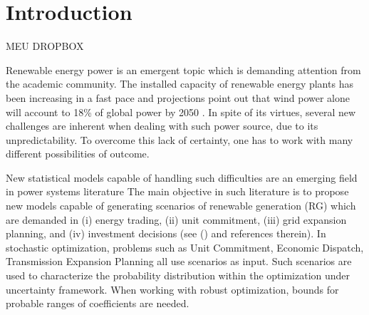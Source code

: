 \section{Introduction}

MEU DROPBOX

Renewable energy power is an emergent topic which is demanding attention from the academic community. %
The installed capacity of renewable energy plants has been increasing in a fast pace and projections point out that wind power alone will account to 18\% of global power by 2050  \cite{IntEnerAgency}.
In spite of its virtues, several new challenges are inherent when dealing with such power source, due to its unpredictability. To overcome this lack of certainty, one has to work with many different possibilities of outcome.

New statistical models capable of handling such difficulties are an emerging field in power systems literature \cite{zhang_review_2014, bessa2012time, gallego2016line,moller_time-adaptive_2008,nielsen2006,bremnes_probabilistic_2004,wan_direct_2017} 
The main objective in such literature is to propose new models capable of generating scenarios of renewable generation (RG) which are demanded in (i) energy trading, (ii) unit commitment, (iii) grid expansion planning, and (iv) investment decisions (see (\cite{moreiraStreet,jabr2013robust,zhaoguan,Aderson2017}) and references therein). 
In stochastic optimization, problems such as Unit Commitment, Economic Dispatch, Transmission Expansion Planning all use scenarios as input. 
Such scenarios are used to characterize the probability distribution within the optimization under uncertainty framework.
When working with robust optimization, bounds for probable ranges of coefficients are needed.


